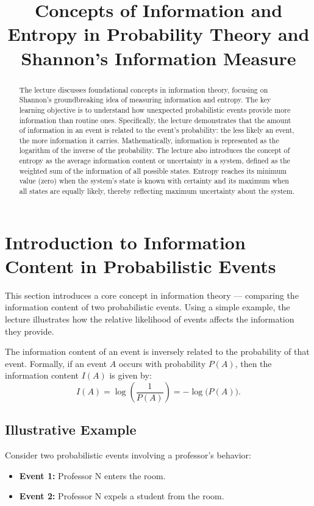 \documentclass[12pt,a4paper]{article}
\title{Concepts of Information and Entropy in Probability Theory and Shannon's Information Measure}
\newenvironment{defbox}[1][]{%
  \begin{tcolorbox}[enhanced, breakable, colback=defcolor, colframe=green!50!black, title=#1, fonttitle=\bfseries, arc=3pt, boxrule=0.5pt]
}{\end{tcolorbox}}
\begin{document}
\maketitle
\begin{abstract}The lecture discusses foundational concepts in information theory, focusing on Shannon's groundbreaking idea of measuring information and entropy. The key learning objective is to understand how unexpected probabilistic events provide more information than routine ones. Specifically, the lecture demonstrates that the amount of information in an event is related to the event’s probability: the less likely an event, the more information it carries. Mathematically, information is represented as the logarithm of the inverse of the probability. The lecture also introduces the concept of entropy as the average information content or uncertainty in a system, defined as the weighted sum of the information of all possible states. Entropy reaches its minimum value (zero) when the system’s state is known with certainty and its maximum when all states are equally likely, thereby reflecting maximum uncertainty about the system.\end{abstract}

\section{Introduction to Information Content in Probabilistic Events}
This section introduces a core concept in information theory — comparing the information content of two probabilistic events. Using a simple example, the lecture illustrates how the relative likelihood of events affects the information they provide.

\begin{defbox}[Information Content and Probability]
The information content of an event is inversely related to the probability of that event. Formally, if an event $A$ occurs with probability $P(A)$, then the information content $I(A)$ is given by:
\[
I(A) = \log \left( \frac{1}{P(A)} \right) = -\log\big(P(A)\big).
\]
\end{defbox}

\subsection{Illustrative Example}
Consider two probabilistic events involving a professor's behavior:
\begin{itemize}
    \item \textbf{Event 1:} Professor N enters the room.
    \item \textbf{Event 2:} Professor N expels a student from the room.
\end{itemize}
\end{document}
